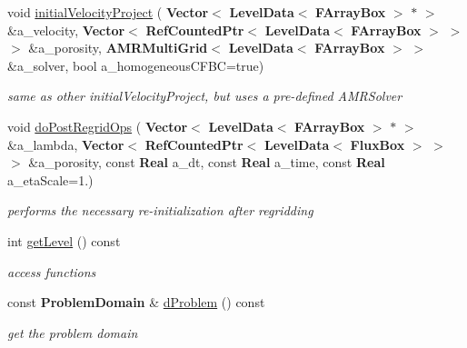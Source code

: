 \begin{DoxyCompactItemize}
\mbox{\label{class_projector_a753d3c89f627a92931da16de08af9587}} 
void \hyperlink{class_projector_a753d3c89f627a92931da16de08af9587}{initial\+Velocity\+Project} (\textbf{ Vector}$<$ \textbf{ Level\+Data}$<$ \textbf{ F\+Array\+Box} $>$ $\ast$ $>$ \&a\+\_\+velocity, \textbf{ Vector}$<$ \textbf{ Ref\+Counted\+Ptr}$<$ \textbf{ Level\+Data}$<$ \textbf{ F\+Array\+Box} $>$ $>$ $>$ \&a\+\_\+porosity, \textbf{ A\+M\+R\+Multi\+Grid}$<$ \textbf{ Level\+Data}$<$ \textbf{ F\+Array\+Box} $>$ $>$ \&a\+\_\+solver, bool a\+\_\+homogeneous\+C\+F\+BC=true)
\begin{DoxyCompactList}\small\item\em same as other initial\+Velocity\+Project, but uses a pre-\/defined A\+M\+R\+Solver \end{DoxyCompactList}\item 
\mbox{\label{class_projector_ac94969d447d694e5a6e6fd4ddf23dacb}} 
void \hyperlink{class_projector_ac94969d447d694e5a6e6fd4ddf23dacb}{do\+Post\+Regrid\+Ops} (\textbf{ Vector}$<$ \textbf{ Level\+Data}$<$ \textbf{ F\+Array\+Box} $>$ $\ast$ $>$ \&a\+\_\+lambda, \textbf{ Vector}$<$ \textbf{ Ref\+Counted\+Ptr}$<$ \textbf{ Level\+Data}$<$ \textbf{ Flux\+Box} $>$ $>$ $>$ \&a\+\_\+porosity, const \textbf{ Real} a\+\_\+dt, const \textbf{ Real} a\+\_\+time, const \textbf{ Real} a\+\_\+eta\+Scale=1.)
\begin{DoxyCompactList}\small\item\em performs the necessary re-\/initialization after regridding \end{DoxyCompactList}\item 
int \hyperlink{class_projector_aa7f8e7fa6873b1972dbaf7458f3af71d}{get\+Level} () const
\begin{DoxyCompactList}\small\item\em access functions \end{DoxyCompactList}\item 
\mbox{\label{class_projector_ae0e798308e9b38472172696b390ca876}} 
const \textbf{ Problem\+Domain} \& \hyperlink{class_projector_ae0e798308e9b38472172696b390ca876}{d\+Problem} () const
\begin{DoxyCompactList}\small\item\em get the problem domain \end{DoxyCompactList}\item 
\mbox{\label{class_projector_a139b4c4a107978be04259f436af16b65}} 

\end{DoxyCompactItemize}
